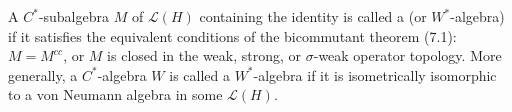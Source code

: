 A $C^*$-subalgebra $M$ of $\mathcal{L}(H)$ containing the identity is called a  (or $W^*$-algebra) if it satisfies the equivalent conditions of the bicommutant theorem (7.1): $M = M^{cc}$, or $M$ is closed in the weak, strong, or $\sigma$-weak operator topology. More generally, a $C^*$-algebra $W$ is called a $W^*$-algebra if it is isometrically isomorphic to a von Neumann algebra in some $\mathcal{L}(H)$.
